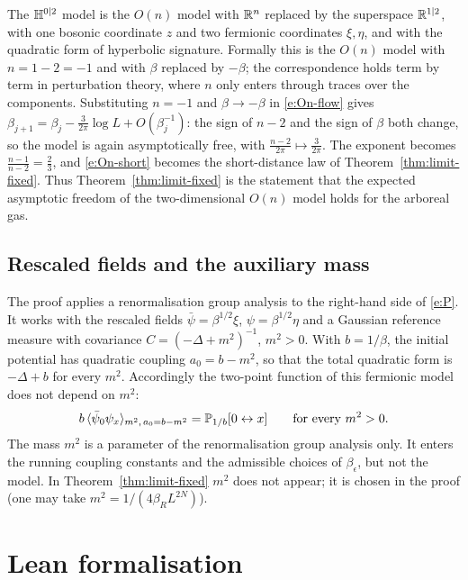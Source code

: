 \documentclass[11pt]{amsart}
\numberwithin{equation}{section}
\numberwithin{theorem}{section}
\newcommand{\conn}{\leftrightarrow}
\begin{document}
The $\mathbb{H}^{0|2}$ model is the $O(n)$ model with $\mathbb{R}^n$ replaced by the superspace $\mathbb{R}^{1|2}$, with one bosonic
coordinate $z$ and two fermionic coordinates $\xi,\eta$, and with the quadratic form of hyperbolic
signature. Formally this is the $O(n)$ model with $n=1-2=-1$ and with $\beta$ replaced by $-\beta$;
the correspondence holds term by term in perturbation theory, where $n$ only enters through
traces over the components. Substituting $n=-1$ and $\beta\to-\beta$ in \eqref{e:On-flow} gives
$\beta_{j+1}=\beta_j-\frac{3}{2\pi}\log L+O(\beta_j^{-1})$: the sign of $n-2$ and the sign of $\beta$
both change, so the model is again asymptotically free, with $\frac{n-2}{2\pi}\mapsto\frac{3}{2\pi}$.
The exponent becomes $\frac{n-1}{n-2}=\frac23$, and \eqref{e:On-short} becomes the short-distance law
of Theorem~\ref{thm:limit-fixed}. Thus Theorem~\ref{thm:limit-fixed} is the statement that the
expected asymptotic freedom of the two-dimensional $O(n)$ model holds for the arboreal gas. %

\subsection{Rescaled fields and the auxiliary mass}
The proof applies a renormalisation group analysis to the right-hand side of \eqref{e:P}. It works with the rescaled fields
$\bar\psi=\beta^{1/2}\xi$, $\psi=\beta^{1/2}\eta$ and a Gaussian reference measure with covariance
$C=(-\Delta+m^2)^{-1}$, $m^2>0$. With $b=1/\beta$, the initial potential has quadratic
coupling $a_0=b-m^2$, so that the total quadratic form is $-\Delta+b$ for every $m^2$. Accordingly
the two-point function of this fermionic model does not depend on $m^2$:
\begin{equation}\label{e:massshift}
  b\,\avg{\bar\psi_0\psi_x}_{m^2,\,a_0=b-m^2}=\P_{1/b}[0\conn x]\qquad\text{for every }m^2>0.
\end{equation}
The mass $m^2$ is a parameter of the renormalisation group analysis only. It enters the running
coupling constants and the admissible choices of $\beta_\epsilon$, but not the model.
In Theorem~\ref{thm:limit-fixed} $m^2$ does not appear; it is chosen in the proof (one may take
$m^2=1/(4\beta_RL^{2N})$).

\section{Lean formalisation}\label{sec:lean}
\end{document}
